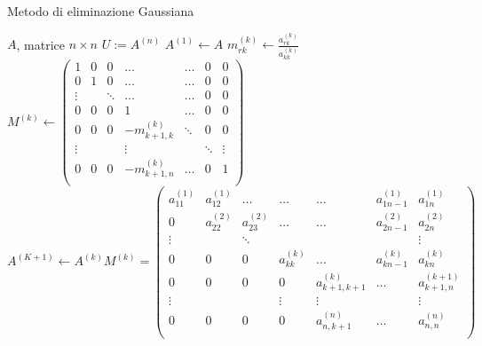 \documentclass[12pt, a4paper]{book}
\theoremstyle{definition}
\begin{document}
\begin{flushleft}
\begin{algorithm}
\caption{Metodo di eliminazione Gaussiana}
	\begin{algorithmic} 
		\REQUIRE $A$, matrice $n \times n$
		\ENSURE $U := A^{(n)}$
		\STATE $ A^{(1)} \leftarrow  A$
				\STATE $m^{(k)}_{rk} \leftarrow \frac{a^{(k)}_{rk}}{a^{(k)}_{kk}}$
			\ENDFOR
			\STATE $M^{(k)} \leftarrow
				 	\begin{pmatrix}
						1 & 0 & 0 & \dots & \dots & 0 & 0 \\
						0 & 1 & 0 & \dots & \dots & 0 & 0 \\
						\vdots & & \ddots & \dots & \dots & 0 & 0\\
						0 & 0 & 0 & 1 & \dots & 0 & 0  \\
						0 & 0 & 0 &-m^{(k)}_{k+1,k} & \ddots & 0 & 0\\
						\vdots & &  & \vdots & & \ddots & \vdots\\
						0& 0  & 0 &-m^{(k)}_{k+1,n} & \dots & 0 & 1 \\
				\end{pmatrix}$
				\vspace{1em}
			\STATE $
				A^{(K+1)} \leftarrow A^{(k)}M^{(k)} = 
				\begin{pmatrix}
						a^{(1)}_{11} & a^{(1)}_{12} & \dots & \dots & \dots & a^{(1)}_{1n-1} & a^{(1)}_{1n} \\
						0 & a^{(2)}_{22} & a^{(2)}_{23}  & \dots & \dots & a^{(2)}_{2n-1}  & a^{(2)}_{2n}  \\
						\vdots & & \ddots &  & & & \vdots\\
						0 & 0 & 0 & a^{(k)}_{kk} & \dots & a^{(k)}_{kn-1}  & a^{(k)}_{kn}   \\
						0 & 0 & 0 &0 & a^{(k)}_{k+1,k+1} & \dots & a^{(k+1)}_{k+1,n}\\
						\vdots & &  & \vdots & \vdots &  & \vdots\\
						0& 0  & 0 & 0 & a^{(n)}_{n,k+1} & \dots & a^{(n)}_{n,n} \\
				\end{pmatrix}
			 $
		\ENDFOR
	\end{algorithmic}
\end{algorithm}


\end{flushleft}
\end{document}
